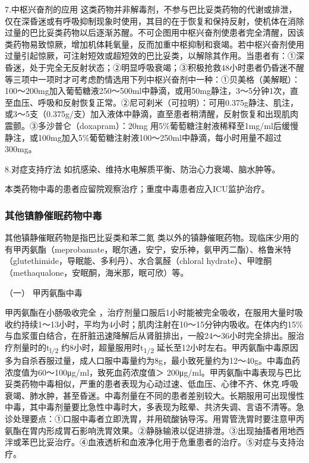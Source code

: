 7.中枢兴奋剂的应用
这类药物并非解毒剂，不参与巴比妥类药物的代谢或排泄，仅在深昏迷或有呼吸抑制现象时使用，其目的在于恢复和保持反射，使机体在消除过量的巴比妥类药物以后逐渐苏醒。不可企图用中枢兴奋剂使患者完全清醒，因该类药物易致惊厥，增加机体耗氧量，反而加重中枢抑制和衰竭。若中枢兴奋剂使用过量引起惊厥，可注射短效或超短效的巴比妥类，以解除其作用。当患者有：①深昏迷，处于完全无反射状态；②明显呼吸衰竭；③积极抢救48小时患者仍昏迷不醒等三项中一项时才可考虑酌情选用下列中枢兴奋剂中一种：①贝美格（美解眠）：100～200mg加入葡萄糖液250～500ml中静滴，或用50mg静注，3～5分钟1次，直至血压、呼吸和反射恢复正常。②尼可刹米（可拉明）：可用0.375g静注、肌注，或3～5支（0.375g/支）加入液体中静滴，直至患者稍清醒，反射恢复和出现肌肉震颤。③多沙普仑（doxapram）：20mg
用5\%葡萄糖注射液稀释至1mg/ml后缓慢静注，或100mg加入5\%葡萄糖注射液100～250ml中静滴，每小时用量不超过300mg。

8.对症支持疗法 如抗感染、维持水电解质平衡、防治心力衰竭、脑水肿等。

本类药物中毒的患者应留院观察治疗；重度中毒患者应入ICU监护治疗。

\subsubsection{其他镇静催眠药物中毒}

其他镇静催眠药物是指巴比妥类和苯二氮{}
类以外的镇静催眠药物。现临床少用的有甲丙氨酯（meprobamate，眠尔通，安宁，安乐神，氨甲丙二酯）、格鲁米特（glutethimide，导眠能、多利丹）、水合氯醛（chloral
hydrate）、甲喹酮（methaqualone，安眠酮，海米那，眠可欣）等。

\hypertarget{text00132.htmlux5cux23CHP5-2-2-3-1}{}
（一） 甲丙氨酯中毒

甲丙氨酯在小肠吸收完全
，治疗剂量口服后1小时能被完全吸收，在服用大量时吸收约持续1～13小时，平均为4小时；肌肉注射在10～15分钟内吸收。在体内约15\%与血浆蛋白结合，在肝脏迅速降解后从肾脏排出，一般24～36小时完全排出。服治疗剂量时的t\textsubscript{l/2}
约8小时，超量服用时t\textsubscript{1/2}
延长至12小时左右。甲丙氨酯中毒原因多为自杀吞服过量，成人口服中毒量约为8g，最小致死量约为12～40g。中毒血药浓度值为60～100μg/ml，致死血药浓度值＞
200μg/ml。甲丙氨酯中毒表现与巴比妥类药物中毒相似，严重的患者表现为心动过速、低血压、心律不齐、休克.呼吸衰竭、肺水肿，甚至昏迷。中毒剂量在不同的患者差别较大。长期服用可出现慢性中毒，其中毒剂量要比急性中毒时大，多表现为眩晕、共济失调、言语不清等。急诊处理要点：①口服中毒者立即洗胃，并用硫酸钠导泻。用胃管洗胃时要注意甲丙氨酯在胃内形成胃石影响洗胃效果。②静脉输液以促进排泄。③出现抽搐者用地西泮或苯巴比妥治疗。④血液透析和血液净化用于危重患者的治疗。⑤对症与支持治疗。

